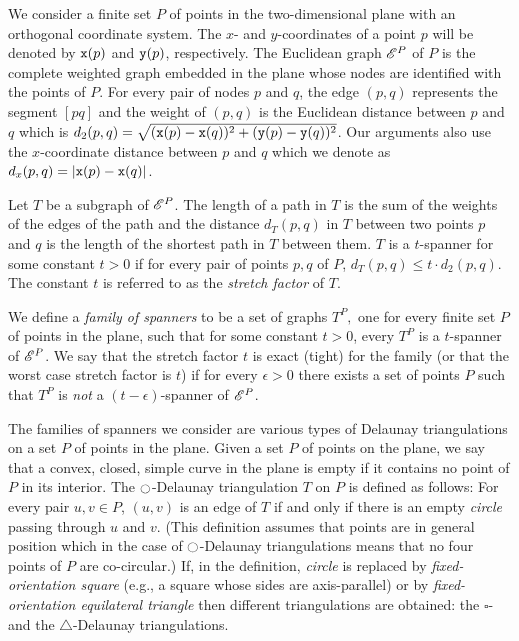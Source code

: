 We consider a finite set $P$ of points in the two-dimensional plane with an
orthogonal coordinate system. The $x$- and $y$-coordinates of a point $p$ will
be denoted by ${\tt x}(p)$ and ${\tt y}(p)$, respectively. The
Euclidean graph $\mathscr{E}^P$ of $P$ is the complete weighted graph embedded in the
plane whose nodes are identified with the points of $P$. For
every pair of nodes $p$ and $q$, the edge $(p,q)$ represents the
segment $[pq]$ and the weight of $(p,q)$ is the Euclidean
distance between $p$ and $q$ which is 
$d_2(p,q) = \sqrt{({\tt x}(p)-{\tt x}(q))^2+({\tt y}(p)-{\tt y}(q))^2}$.
Our arguments also use the $x$-coordinate distance between 
$p$ and $q$ which we denote as $d_x(p,q) = |{\tt x}(p)-{\tt x}(q)|$.

Let $T$ be a subgraph of $\mathscr{E}^P$. The length of a path in $T$ is the sum of the
weights of the edges of the path and the distance $d_T(p,q)$ in $T$
between two points $p$ and $q$ is the length of the shortest
path in $T$ between them. $T$ is a $t$-spanner for some constant $t>0$ 
if for every pair of points $p,q$ of $P$, $d_T(p,q) \leq t \cdot d_2(p,q)$. The
constant $t$ is referred to as the {\em stretch factor} of $T$.

We define a {\em family of spanners} to be a set of graphs $T^P,$
one for every finite set $P$ of points in the plane, such that for some
constant $t>0$, every $T^P$ is a $t$-spanner of $\mathscr{E}^P$. 
We say that the stretch factor $t$ is exact (tight) for the family
(or that the worst case stretch factor is $t$) if for every $\epsilon > 0$
there exists a set of points $P$ such that $T^P$ is {\em not} a
$(t-\epsilon)$-spanner of $\mathscr{E}^P$. 

The families of spanners we consider are various types of Delaunay
triangulations on a set $P$ of points in the plane. Given a set $P$ of
points on the plane, we say that a convex, closed, simple curve in the plane is
empty if it contains no point of $P$ in its interior. The $\ocircle$-Delaunay
triangulation $T$ on $P$ is defined as follows: For every pair $u,v \in P$,
$(u,v)$ is an edge of $T$ if and only if there is an empty {\em circle} passing through
$u$ and $v$. (This definition assumes that
points are in general position which in the case of $\ocircle$-Delaunay
triangulations means that no four points of $P$ are co-circular.) If,
in the definition, 
{\em circle} is replaced by {\em fixed-orientation square} (e.g., a square
whose sides are axis-parallel) or by {\em fixed-orientation equilateral
triangle} then different triangulations are obtained: the $\square$-
and the $\triangle$-Delaunay triangulations.

